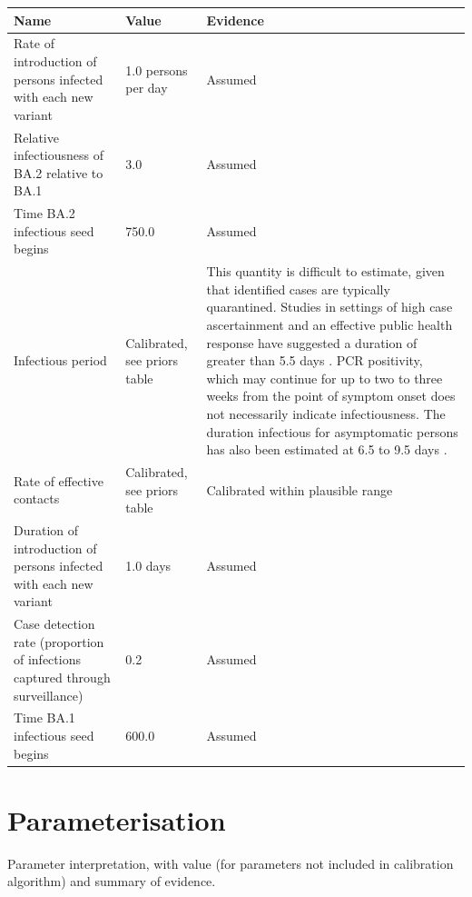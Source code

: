 \documentclass{article}%
\begin{document}
%
\begin{tabular}{p{2.7cm} p{2.7cm} p{5.8cm}}%
\hline%
\textbf{Name}&\textbf{Value}&\textbf{Evidence}\\%
\hline%
Rate of introduction of persons infected with each new variant&1.0 persons per day&Assumed\\%
\hline%
Relative infectiousness of BA.2 relative to BA.1&3.0 &Assumed\\%
\hline%
Time BA.2 infectious seed begins&750.0 &Assumed\\%
\hline%
Infectious period&Calibrated, see priors table&This quantity is difficult to estimate, given that identified cases are typically quarantined. Studies in settings of high case ascertainment and an effective public health response have suggested a duration of greater than 5.5 days \cite{bi2020}. PCR positivity, which may continue for up to two to three weeks from the point of symptom onset \cite{he2020} \cite{byrne2020} does not necessarily indicate infectiousness. The duration infectious for asymptomatic persons has also been estimated at 6.5 to 9.5 days \cite{byrne2020}.\\%
\hline%
Rate of effective contacts&Calibrated, see priors table&Calibrated within plausible range\\%
\hline%
Duration of introduction of persons infected with each new variant&1.0 days&Assumed\\%
\hline%
Case detection rate (proportion of infections captured through surveillance)&0.2 &Assumed\\%
\hline%
Time BA.1 infectious seed begins&600.0 &Assumed\\%
\hline%
\end{tabular}%
\linebreak

%
\section{Parameterisation}%
\label{sec:Parameterisation}%
Parameter interpretation, with value (for parameters not included in calibration algorithm) and summary of evidence. \newline%

%
\newpage%
\printbibliography%
\end{document}
